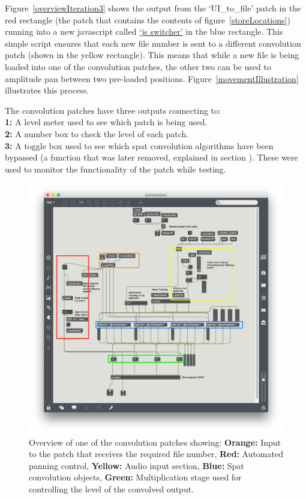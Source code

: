 \documentclass[../../main.tex]{subfiles}
\begin{document}
			Figure~\ref{overviewIteration3} shows the output from the `UI\_to\_file' patch in the red rectangle (the patch that contains the contents of figure~\ref{storeLocations}) running into a new javascript called \href{http://lt669.github.io/code/javascript/html/switcher.html}{`js switcher'} in the blue rectangle. This simple script ensures that each new file number is sent to a different convolution patch (shown in the yellow rectangle). This means that while a new file is being loaded into one of the convolution patches, the other two can be used to amplitude pan between two pre-loaded positions. Figure~\ref{movementIllustration} illustrates this process.

			The convolution patches have three outputs connecting to:\\
			\textbf{1:} A level meter used to see which patch is being used.\\
			\textbf{2:} A number box to check the level of each patch. \\
			\textbf{3:} A toggle box used to see which spat convolution algorithms have been bypassed (a function that was later removed, explained in section ). These were used to monitor the functionality of the patch while testing.

			\begin{figure}[t]
				\centerline{\includegraphics[scale = 0.4]{Sections/Implementation/Max/images/Max/Iteration3/convPatch_edit.png}}
				\caption{Overview of one of the convolution patches showing: \textbf{Orange:} Input to the patch that receives the required file number, \textbf{Red:} Automated panning control, \textbf{Yellow:} Audio input section, \textbf{Blue:} Spat convolution objects, \textbf{Green:} Multiplication stage used for controlling the level of the convolved output.}
				\label{convPatch}
			\end{figure}
\end{document}
